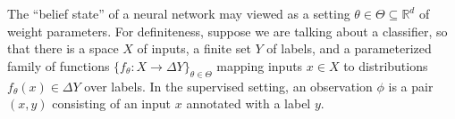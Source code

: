 \begin{example}\label{ex:classifier}
The ``belief state'' of a neural network may viewed as a setting $\theta \in \Theta \subseteq \mathbb R^d$ of weight parameters.
For definiteness, suppose we are talking about a classifier, so that
there is a space $X$ of inputs, a finite set $Y$ of labels,
and a parameterized family of functions
$\{ f_\theta : X \to \Delta Y \}_{\theta \in \Theta}$ mapping inputs $x \in X$ to distributions $f_\theta(x) \in \Delta Y$ over labels.
In the supervised setting, an observation $\phi$ is a pair $(x,y)$ consisting of an input $x$ annotated with a label $y$.


\end{example}
